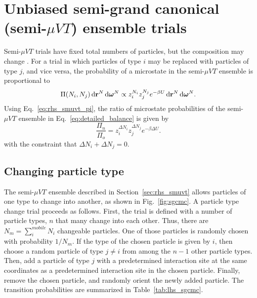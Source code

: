 \section{\label{sec:rhs_smuvt}Unbiased semi-grand canonical (semi-$\mu VT$) ensemble trials}

Semi-$\mu VT$ trials have fixed total numbers of particles, but the composition may change \cite{kofke_monte_1988}.
For a trial in which particles of type $i$ may be replaced with particles of type $j$, and vice versa, the probability of a microstate in the semi-$\mu VT$ ensemble is proportional to \cite{kofke_monte_1988}
\begin{equation}
\Pi(N_i,N_j) \mathop{}\!\mathrm{d}\mathbf{r}^N \mathop{}\!\mathrm{d}\boldsymbol{\omega}^N\propto z_i^{N_i} z_j^{N_j} e^{-\beta U} \mathop{}\!\mathrm{d}\mathbf{r}^N\mathop{}\!\mathrm{d}\boldsymbol{\omega}^N.
\label{eq:rhs_smuvt_pi}
\end{equation}
Using Eq.~\ref{eq:rhs_smuvt_pi}, the ratio of microstate probabilities of the semi-$\mu VT$ ensemble in Eq.~\ref{eq:detailed_balance} is given by
\begin{equation}
\frac{\Pi_n}{\Pi_o} = z_i^{\Delta N_i}z_j^{\Delta N_j} e^{-\beta\Delta U}.
\label{eq:rhs_sgcmc}
\end{equation}
with the constraint that $\Delta N_i + \Delta N_j = 0$.

\subsection{\label{sec:lhs_sgcmc}Changing particle type}

The semi-$\mu VT$ ensemble described in Section~\ref{sec:rhs_smuvt} allows particles of one type to change into another, as shown in Fig.~\ref{fig:sgcmc}.
A particle type change trial proceeds as follows.
First, the trial is defined with a number of particle types, $n$ that many change into each other.
Thus, there are $N_m=\sum_i^{mobile} N_i$ changeable particles.
One of those particles is randomly chosen with probability $1/N_m$.
If the type of the chosen particle is given by $i$, then choose a random particle of type $j \neq i$ from among the $n-1$ other particle types.
Then, add a particle of type $j$ with a predetermined interaction site at the same coordinates as a predetermined interaction site in the chosen particle.
Finally, remove the chosen particle, and randomly orient the newly added particle.
The transition probabilities are summarized in Table~\ref{tab:lhs_sgcmc}.

